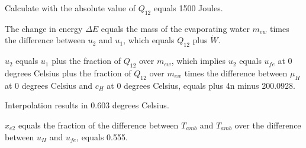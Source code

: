 Calculate with the absolute value of \( Q_{12} \) equals 1500 Joules.

The change in energy \( \Delta E \) equals the mass of the evaporating water \( m_{ew} \) times the difference between \( u_2 \) and \( u_1 \), which equals \( Q_{12} \) plus \( \dot{W} \).

\( u_2 \) equals \( u_1 \) plus the fraction of \( Q_{12} \) over \( m_{ew} \), which implies \( u_2 \) equals \( u_{fe} \) at 0 degrees Celsius plus the fraction of \( Q_{12} \) over \( m_{ew} \) times the difference between \( \mu_{H} \) at 0 degrees Celsius and \( c_{H} \) at 0 degrees Celsius, equals plus 4n minus 200.0928.

Interpolation results in 0.603 degrees Celsius.

\( x_{e2} \) equals the fraction of the difference between \( T_{amb} \) and \( T_{amb} \) over the difference between \( u_{H} \) and \( u_{fe} \), equals 0.555.